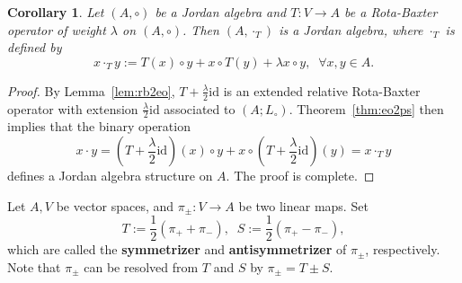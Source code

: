 \documentclass[12pt, reqno, a4paper]{amsart}
\newtheorem{corollary}[theorem]{Corollary}
\theoremstyle{definition}
\newcommand{\id}{\mathrm{id}}
\begin{document}
\begin{corollary}
	Let $(A, \circ)$ be a Jordan algebra and $T: V \to A$ be a Rota-Baxter operator of weight $\lambda$ on $(A, \circ)$.
	Then $(A, \cdot_{T})$ is a Jordan algebra, where $\cdot_{T}$ is defined by
	\begin{equation*}
		x \cdot_{T} y:= T(x) \circ y + x \circ T(y) + \lambda x \circ y, \;\; \forall x, y \in A. 
	\end{equation*}
\end{corollary}
\begin{proof}
	By Lemma~\ref{lem:rb2eo}, $T + \frac{\lambda}{2}\id$ is an extended relative Rota-Baxter operator with extension $\frac{\lambda}{2}\id$ associated to $(A; L_{\circ})$.
	Theorem~\ref{thm:eo2ps} then implies that the binary operation
	\begin{equation*}
		x \cdot y = (T + \frac{\lambda}{2}\id)(x) \circ y + x \circ (T + \frac{\lambda}{2}\id)(y) = x \cdot_{T} y
	\end{equation*}
	defines a Jordan algebra structure on $A$.
	The proof is complete.
\end{proof}


Let $A, V$ be vector spaces, and $\pi_{\pm}: V \to A$ be two linear maps.
Set
\begin{equation*}
	T:= \frac{1}{2}(\pi_{+} + \pi_{-}), \;\;
	S := \frac{1}{2}(\pi_{+} - \pi_{-}),
\end{equation*}
which are called the \textbf{symmetrizer} and \textbf{antisymmetrizer} of $\pi_{\pm}$, respectively.
Note that $\pi_{\pm}$ can be resolved from $T$ and $S$ by $\pi_{\pm} = T \pm S$.
\end{document}
